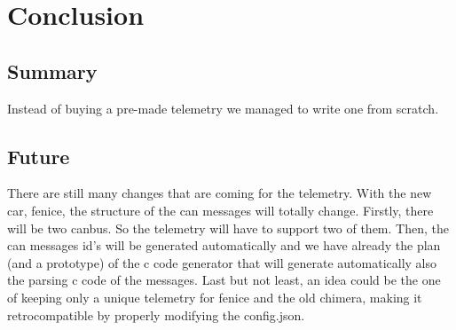 \section{\huge{Conclusion}}

\subsection{Summary}
Instead of buying a pre-made telemetry we managed to write one from scratch.

\subsection{Future}
There are still many changes that are coming for the telemetry. With the new car, fenice, the structure of the can messages will totally 
change. Firstly, there will be two canbus. So the telemetry will have to support two of them. Then, the can messages id's will be generated
automatically and we have already the plan (and a prototype) of the c code generator that will generate automatically also the 
parsing c code of the messages. Last but not least, an idea could be the one of keeping only a unique telemetry for fenice and the old
chimera, making it retrocompatible by properly modifying the config.json.